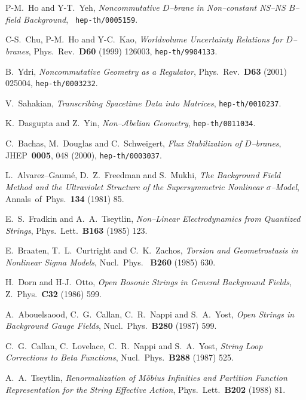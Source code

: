 \documentclass[a4paper,11pt]{article}
\begin{document}
\begin{thebibliography}{99}
{  {\small P-M.~Ho and Y-T.~Yeh, \textit{Noncommutative 
$D$--brane in Non--constant NS--NS $B$--field Background}, \texttt{
hep-th/0005159}. }

  {\small C-S.~Chu, P-M.~Ho and Y-C.~Kao, \textit{
Worldvolume Uncertainty Relations for $D$--branes}, Phys.\ Rev.\ \textbf{D60}
(1999) 126003, \texttt{hep-th/9904133}. }

  {\small B.~Ydri, \textit{Noncommutative Geometry as a
Regulator}, Phys.\ Rev.\ \textbf{D63} (2001) 025004,
\texttt{hep-th/0003232}. }

  {\small V.~Sahakian, \textit{Transcribing Spacetime Data
into Matrices}, \texttt{hep-th/0010237}. }

  {\small K.~Dasgupta and Z.~Yin, \textit{
Non--$\mathcal{A}$belian Geometry}, \texttt{hep-th/0011034}. }

 {\small C.~Bachas, M.~Douglas and C.~Schweigert, \textit{Flux
Stabilization of $D$--branes}, JHEP\ \textbf{0005}, 048 (2000),
\texttt{hep-th/0003037}. }

  {\small L.~Alvarez--Gaum\'e, D.~Z.~Freedman and S.~Mukhi, 
\textit{The Background Field Method and the Ultraviolet Structure of the
Supersymmetric Nonlinear $\sigma$--Model}, Annals\ of\ Phys.\ \textbf{134}
(1981) 85. }

  {\small E.~S.~Fradkin and A.~A.~Tseytlin, 
\textit{Non--Linear Electrodynamics from Quantized Strings}, Phys.\ Lett.\ 
\textbf{B163} (1985) 123. }

  {\small E.~Braaten, T.~L.~Curtright and C.~K.~Zachos, \textit{
Torsion and Geometrostasis in Nonlinear Sigma Models}, Nucl.\ Phys.\ \textbf{
B260} (1985) 630. }

  {\small H.~Dorn and H-J.~Otto, \textit{Open Bosonic
Strings in General Background Fields}, Z.\ Phys.\ \textbf{C32} (1986) 599. }

  {\small A.~Abouelsaood, C.~G.~Callan, C.~R.~Nappi and
S.~A.~Yost, \textit{Open Strings in Background Gauge Fields}, Nucl.\ Phys.\ 
\textbf{B280} (1987) 599. }

  {\small C.~G.~Callan, C.~Lovelace, C.~R.~Nappi and
S.~A.~Yost, \textit{String Loop Corrections to Beta Functions}, Nucl.\
Phys.\ \textbf{B288} (1987) 525. }

\bibitem{Tseytlin}  {\small A.~A.~Tseytlin, \textit{Renormalization of
M\"obius Infinities and Partition Function Representation for the String
Effective Action}, Phys.\ Lett.\ \textbf{B202} (1988) 81. }

}
\end{thebibliography}
\end{document}

